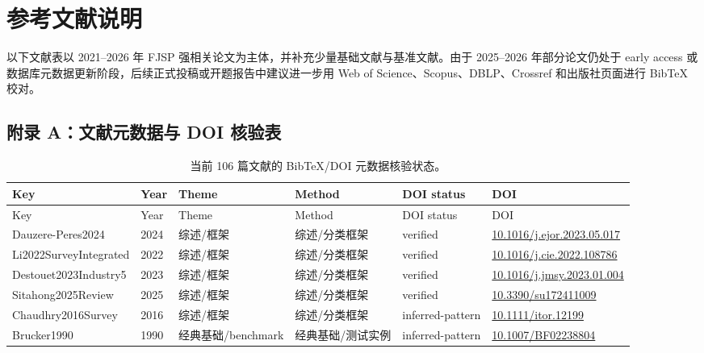 \documentclass[UTF8,a4paper,11pt]{ctexart}
\begin{document}
\newpage

\section*{参考文献说明}
以下文献表以 2021--2026 年 FJSP 强相关论文为主体，并补充少量基础文献与基准文献。由于 2025--2026 年部分论文仍处于 early access 或数据库元数据更新阶段，后续正式投稿或开题报告中建议进一步用 Web of Science、Scopus、DBLP、Crossref 和出版社页面进行 BibTeX 校对。



\clearpage
\begin{landscape}
\section*{附录 A：文献元数据与 DOI 核验表}
\scriptsize
\begin{longtable}{>{\raggedright\arraybackslash}p{5.0cm}p{0.8cm}>{\raggedright\arraybackslash}p{2.6cm}>{\raggedright\arraybackslash}p{2.8cm}>{\raggedright\arraybackslash}p{2.6cm}>{\raggedright\arraybackslash}p{5.4cm}}
\caption{当前 106 篇文献的 BibTeX/DOI 元数据核验状态。}\label{tab:doi-audit}\\
\toprule
Key & Year & Theme & Method & DOI status & DOI \\
\midrule
\endfirsthead
\toprule
Key & Year & Theme & Method & DOI status & DOI \\
\midrule
\endhead
Dauzere-Peres2024 & 2024 & 综述/框架 & 综述/分类框架 & verified & \href{https://doi.org/10.1016/j.ejor.2023.05.017}{10.1016/j.ejor.2023.05.017} \\
Li2022SurveyIntegrated & 2022 & 综述/框架 & 综述/分类框架 & verified & \href{https://doi.org/10.1016/j.cie.2022.108786}{10.1016/j.cie.2022.108786} \\
Destouet2023Industry5 & 2023 & 综述/框架 & 综述/分类框架 & verified & \href{https://doi.org/10.1016/j.jmsy.2023.01.004}{10.1016/j.jmsy.2023.01.004} \\
Sitahong2025Review & 2025 & 综述/框架 & 综述/分类框架 & verified & \href{https://doi.org/10.3390/su172411009}{10.3390/su172411009} \\
Chaudhry2016Survey & 2016 & 综述/框架 & 综述/分类框架 & inferred-pattern & \href{https://doi.org/10.1111/itor.12199}{10.1111/itor.12199} \\
Brucker1990 & 1990 & 经典基础/benchmark & 经典基础/测试实例 & inferred-pattern & \href{https://doi.org/10.1007/BF02238804}{10.1007/BF02238804} \\

\end{longtable}
\end{landscape}
\end{document}
